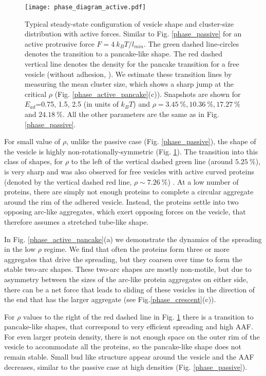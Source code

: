 \documentclass[pre,amsmath]{revtex4}
\begin{document}
\begin{figure}[ht]
\centering
\texttt{[image: phase\_diagram\_active.pdf]}
\caption{Typical steady-state configuration of vesicle shape and cluster-size distribution with active forces. Similar to Fig. \ref{phase_passive} for an active protrusive force $F=4 ~k_B T/l_{min}$. The green dashed line-circles denotes the transition to a pancake-like shape. The red dashed vertical line denotes the density for the pancake transition for a free vesicle (without adhesion, \cite{miha2019}). We estimate these transition lines by measuring the mean cluster size, which shows a sharp jump at the critical $\rho$ (Fig. \ref{phase_active_pancake}(c)). Snapshots are shown for $E_{ad}$=0.75, 1.5, 2.5 (in units of $k_B T$) and $\rho=3.45 ~\%, 10.36 ~\%, 17.27 ~\%$ and $24.18 ~\%$. All the other parameters are the same as in Fig. \ref{phase_passive}. }
\label{phase_active} 
\end{figure}



For small value of $\rho$, unlike the passive case (Fig. \ref{phase_passive}), the shape of the vesicle is highly non-rotationally-symmetric (Fig. \ref{phase_active}). The transition into this class of shapes, for $\rho$ to the left of the vertical dashed green line (around $5.25 ~\%$), is very sharp and was also observed for free vesicles with active curved proteins (denoted by the vertical dashed red line, $\rho \sim 7.26 ~\%$) \cite{miha2019}. At a low number of proteins, there are simply not enough proteins to complete a circular aggregate around the rim of the adhered vesicle. Instead, the proteins settle into two opposing arc-like aggregates, which exert opposing forces on the vesicle, that therefore assumes a stretched tube-like shape. 

In Fig. \ref{phase_active_pancake}(a) we demonstrate the dynamics of the spreading in the low $\rho$ regime. We find that often the proteins form three or more aggregates that drive the spreading, but they coarsen over time to form the stable two-arc shapes. These two-arc shapes are mostly non-motile, but due to asymmetry between the sizes of the arc-like protein aggregates on either side, there can be a net force that leads to sliding of these vesicles in the direction of the end that has the larger aggregate (see Fig.\ref{phase_crescent}(c)). 

For $\rho$ values to the right of the red dashed line in Fig. \ref{phase_active} there is a transition to pancake-like shapes, that correspond to very efficient spreading and high AAF. For even larger protein density, there is not enough space on the outer rim of the vesicle to accommodate all the proteins, so the pancake-like shape does not remain stable. Small bud like structure appear around the vesicle and the AAF decreases, similar to the passive case at high densities (Fig. \ref{phase_passive}).
\end{document}
